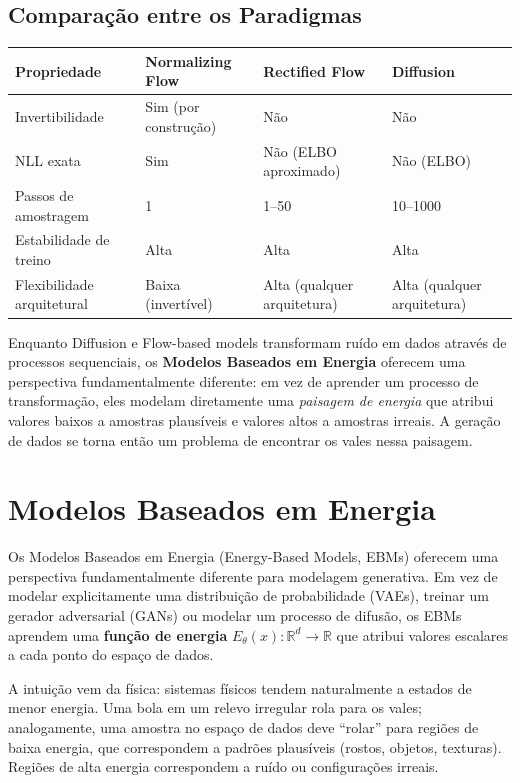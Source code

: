 \documentclass{tufte-handout}
\begin{document}
\subsection{Comparação entre os Paradigmas}

\medskip
\noindent
\begin{tabularx}{\textwidth}{l X X X}
\hline
\textbf{Propriedade} & \textbf{Normalizing Flow} & \textbf{Rectified Flow} & \textbf{Diffusion} \\
\hline
Invertibilidade & Sim (por construção) & Não & Não \\
NLL exata & Sim & Não (ELBO aproximado) & Não (ELBO) \\
Passos de amostragem & 1 & 1--50 & 10--1000 \\
Estabilidade de treino & Alta & Alta & Alta \\
Flexibilidade arquitetural & Baixa (invertível) & Alta (qualquer arquitetura) & Alta (qualquer arquitetura) \\
\hline
\end{tabularx}

\medskip
\noindent Enquanto Diffusion e Flow-based models transformam ruído em dados através de processos sequenciais, os \textbf{Modelos Baseados em Energia} oferecem uma perspectiva fundamentalmente diferente: em vez de aprender um processo de transformação, eles modelam diretamente uma \textit{paisagem de energia} que atribui valores baixos a amostras plausíveis e valores altos a amostras irreais. A geração de dados se torna então um problema de encontrar os vales nessa paisagem.

\section{Modelos Baseados em Energia}

Os Modelos Baseados em Energia (Energy-Based Models, EBMs) oferecem uma perspectiva fundamentalmente diferente para modelagem generativa. Em vez de modelar explicitamente uma distribuição de probabilidade (VAEs), treinar um gerador adversarial (GANs) ou modelar um processo de difusão, os EBMs aprendem uma \textbf{função de energia} $E_\theta(x): \mathbb{R}^d \rightarrow \mathbb{R}$ que atribui valores escalares a cada ponto do espaço de dados.

A intuição vem da física: sistemas físicos tendem naturalmente a estados de menor energia. Uma bola em um relevo irregular rola para os vales; analogamente, uma amostra no espaço de dados deve ``rolar'' para regiões de baixa energia, que correspondem a padrões plausíveis (rostos, objetos, texturas). Regiões de alta energia correspondem a ruído ou configurações irreais.
\end{document}
